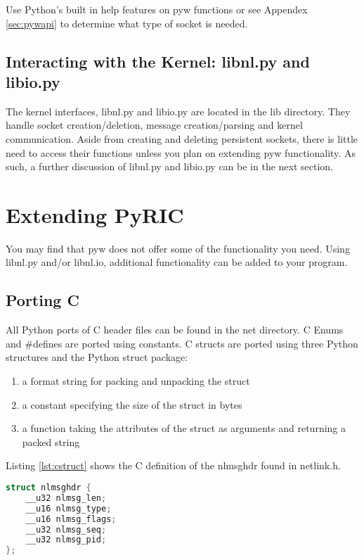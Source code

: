 \documentclass[11pt]{article}
\begin{document}
Use Python's built in help features on pyw functions or see Appendex \ref{sec:pywapi} 
to determine what type of 
socket is needed.

\subsection{Interacting with the Kernel: libnl.py and libio.py}
The kernel interfaces, libnl.py and libio.py are located in the lib directory.
They handle socket creation/deletion, message creation/parsing and kernel 
communication. Aside from creating and deleting persistent sockets, there is 
little need to access their functions unless you plan on extending pyw 
functionality. As such, a further discussion of libnl.py and libio.py can be in
the next section.   

\section{Extending PyRIC}\label{sec:extending}
You may find that pyw does not offer some of the functionality you need. Using
libnl.py and/or libnl.io, additional functionality can be added to your program. 

\subsection{Porting C}
All Python ports of C header files can be found in the net directory. C Enums and 
\#defines are ported using constants. C structs are ported using three Python 
structures and the Python struct package:
\begin{enumerate}
\item a format string for packing and unpacking the struct
\item a constant specifying the size of the struct in bytes
\item a function taking the attributes of the struct as arguments and returning
a packed string
\end{enumerate}
Listing \ref{lst:cstruct} shows the C definition of the nlmsghdr found in netlink.h.

\begin{lstlisting}[caption={C Struct nlmsghdr},
                   label={lst:cstruct},
                   language=C]
struct nlmsghdr {
    __u32 nlmsg_len;
    __u16 nlmsg_type;
    __u16 nlmsg_flags;
    __u32 nlmsg_seq;
    __u32 nlmsg_pid;
};
\end{lstlisting}
\end{document}
